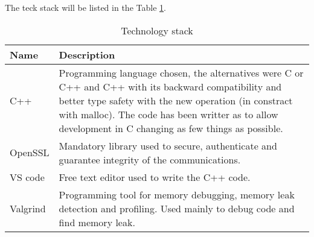 The teck stack will be listed in the Table \ref{tab:teck-stack}.
\begin{longtable}{|p{}|p{}|}
	\caption{Technology stack}
	\label{Technology stack} 
	\label{tab:teck-stack} \\
	\hline
	\textbf{Name} & \textbf{Description} \\
	\hline
	C++ & Programming language chosen, the alternatives were C or C++ and C++ with its backward compatibility and better type safety with the new operation (in constract with malloc). The code has been writter as to allow development in C changing as few things as possible. \\
	\hline
	OpenSSL & Mandatory library used to secure, authenticate and guarantee integrity of the communications. \\
	\hline
	VS code & Free text editor used to write the C++ code. \\
	\hline
	Valgrind & Programming tool for memory debugging, memory leak detection and profiling. Used mainly to debug code and find memory leak. \\
	\hline
\end{longtable}%
	

